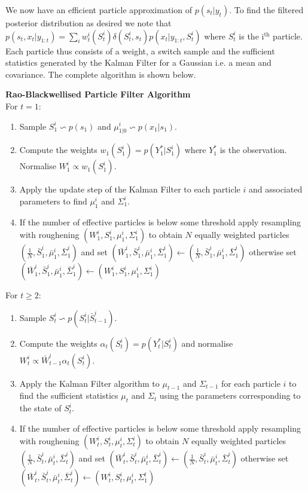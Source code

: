 We now have an efficient particle approximation of $p(s_t|y_t)$. To find the filtered posterior distribution as desired we note that $p(s_t,x_t|y_{1:t}) = \sum_i w_t^i(S_t^i)\delta(S_t^i, s_t)p(x_t|y_{1:t}, S_t^i)$ where $S_t^i$ is the i$^{\text{th}}$ particle. Each particle thus consists of a weight, a switch sample and the sufficient statistics generated by the Kalman Filter for a Gaussian i.e. a mean and covariance. The complete algorithm is shown below.

\textbf{Rao-Blackwellised Particle Filter Algorithm}\\
For $t=1$:
\begin{enumerate}
\item
Sample $S^i_1 \backsim p(s_1)$ and $\mu_{1|0}^i \backsim p(x_1|s_1)$.
\item
Compute the weights $w_1(S_1^i) = p(Y^*_1|S_1^i)$ where $Y^*_1$ is the observation. Normalise $W^i_1 \propto w_1(S^i_1)$.
\item
Apply the update step of the Kalman Filter to each particle $i$ and associated parameters to find $\mu_1^i$ and $\Sigma_1^i$. 
\item
If the number of effective particles is below some threshold apply resampling with roughening $(W^i_1, {S}^i_1,{\mu}^i_1, {\Sigma}^i_1)$ to obtain $N$ equally weighted particles $(\frac{1}{N}, \bar{S}^i_1, \bar{\mu}^i_1, \bar{\Sigma}^i_1)$ and set $(\bar{W}^i_1, \bar{S}^i_1, \bar{\mu}^i_1, \bar{\Sigma}^i_1) \leftarrow (\frac{1}{N}, \bar{S}^i_1, \bar{\mu}^i_1, \bar{\Sigma}^i_1)$ otherwise set $(\bar{W}^i_1, \bar{S}^i_1, \bar{\mu}^i_1, \bar{\Sigma}^i_1) \leftarrow ({W}^i_1, {S}^i_1, \mu^i_1, \Sigma_1^i)$
\end{enumerate}
For $t \geq 2$:
\begin{enumerate}
\item
Sample $S^i_t \backsim p(S_t^i|\bar{S}^i_{t-1})$.
\item
Compute the weights $\alpha_t(S^i_{t}) = p(Y^*_t|S_t^i)$ and normalise $W^i_t \propto \bar{W}^i_{t-1}\alpha_t(S^i_{t})$.
\item
Apply the Kalman Filter algorithm to $\mu_{t-1}$ and $\Sigma_{t-1}$ for each particle $i$ to find the sufficient statistics $\mu_{t}$ and $\Sigma_{t}$ using the parameters corresponding to the state of $S^i_t$.
\item
If the number of effective particles is below some threshold apply resampling with roughening $(W^i_t, {S}^i_t,{\mu}^i_t, {\Sigma}^i_t)$ to obtain $N$ equally weighted particles $(\frac{1}{N}, \bar{S}^i_t, \bar{\mu}^i_t, \bar{\Sigma}^i_t)$ and set $(\bar{W}^i_t, \bar{S}^i_t, \bar{\mu}^i_t, \bar{\Sigma}^i_t) \leftarrow (\frac{1}{N}, \bar{S}^i_t, \bar{\mu}^i_t, \bar{\Sigma}^i_t)$ otherwise set $(\bar{W}^i_t, \bar{S}^i_t, \bar{\mu}^i_t, \bar{\Sigma}^i_t) \leftarrow ({W}^i_t, {S}^i_t, \mu^i_t, \Sigma_1^t)$
\end{enumerate} 

